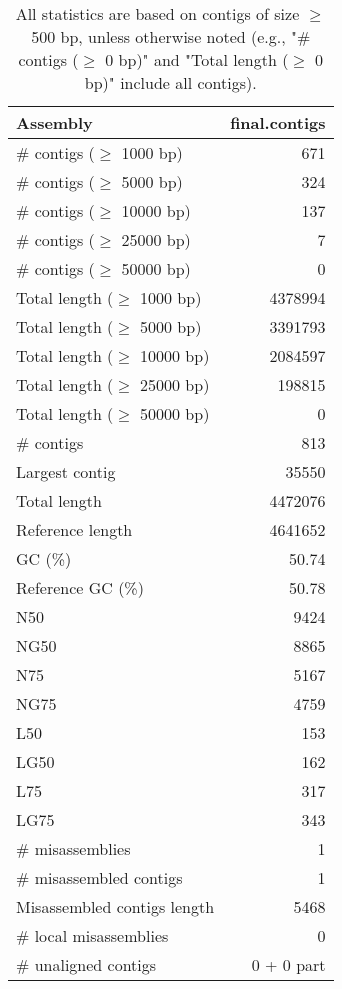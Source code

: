 \documentclass[12pt,a4paper]{article}
\begin{document}
\begin{table}[ht]
\begin{center}
\caption{All statistics are based on contigs of size $\geq$ 500 bp, unless otherwise noted (e.g., "\# contigs ($\geq$ 0 bp)" and "Total length ($\geq$ 0 bp)" include all contigs).}
\begin{tabular}{|l*{1}{|r}|}
\hline
Assembly & final.contigs \\ \hline
\# contigs ($\geq$ 1000 bp) & 671 \\ \hline
\# contigs ($\geq$ 5000 bp) & 324 \\ \hline
\# contigs ($\geq$ 10000 bp) & 137 \\ \hline
\# contigs ($\geq$ 25000 bp) & 7 \\ \hline
\# contigs ($\geq$ 50000 bp) & 0 \\ \hline
Total length ($\geq$ 1000 bp) & 4378994 \\ \hline
Total length ($\geq$ 5000 bp) & 3391793 \\ \hline
Total length ($\geq$ 10000 bp) & 2084597 \\ \hline
Total length ($\geq$ 25000 bp) & 198815 \\ \hline
Total length ($\geq$ 50000 bp) & 0 \\ \hline
\# contigs & 813 \\ \hline
Largest contig & 35550 \\ \hline
Total length & 4472076 \\ \hline
Reference length & 4641652 \\ \hline
GC (\%) & 50.74 \\ \hline
Reference GC (\%) & 50.78 \\ \hline
N50 & 9424 \\ \hline
NG50 & 8865 \\ \hline
N75 & 5167 \\ \hline
NG75 & 4759 \\ \hline
L50 & 153 \\ \hline
LG50 & 162 \\ \hline
L75 & 317 \\ \hline
LG75 & 343 \\ \hline
\# misassemblies & 1 \\ \hline
\# misassembled contigs & 1 \\ \hline
Misassembled contigs length & 5468 \\ \hline
\# local misassemblies & 0 \\ \hline
\# unaligned contigs & 0 + 0 part \\ \hline

\end{tabular}
\end{center}
\end{table}
\end{document}
